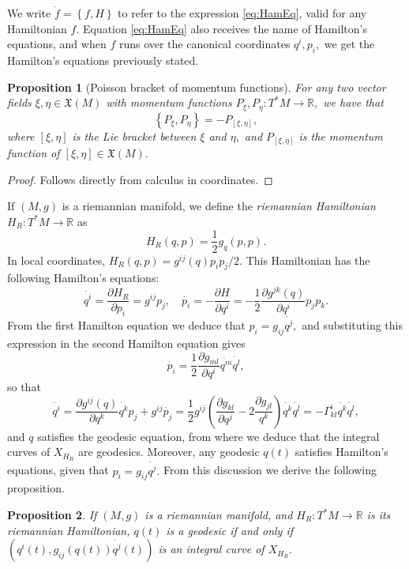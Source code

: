 \documentclass[12pt, letterpaper, reqno]{amsart}
\theoremstyle{definition}
\theoremstyle{plain}
\newtheorem{prop}{Proposition}
\theoremstyle{remark}
\begin{document}
We write $ \dot{f}= \left\{ f,H \right\} $ to refer to the expression \eqref{eq:HamEq}, valid for any Hamiltonian $ f. $ Equation \eqref{eq:HamEq} also receives the name of Hamilton's equations, and when $ f $ runs over the canonical coordinates $ q^i,p_i, $ we get the Hamilton's equations previously stated.

\begin{prop}[Poisson bracket of momentum functions]
	For any two vector fields $ \xi,\eta \in \mathfrak{X}(M) $ with momentum functions $ P_\xi, P_\eta: T^*M \rightarrow \mathbb{R}, $ we have that
	$$ \left\{ P_\xi,P_\eta \right\} = -P_{[\xi,\eta]}, $$ 
	where $ [\xi,\eta] $ is the Lie bracket between $ \xi $ and $ \eta, $ and $ P_{[\xi,\eta]} $ is the momentum function of $ [\xi,\eta]\in \mathfrak{X}(M). $  
\end{prop}
\begin{proof}
	Follows directly from calculus in coordinates.
\end{proof}
If $ (M,g) $ is a riemannian manifold, we define the \textit{riemannian Hamiltonian} $ H_R: T^*M \rightarrow \mathbb{R} $ as
$$ H_R(q,p)=\frac{1}{2} g_q(p,p).$$
In local coordinates, $  H_R(q,p)= g^{ij}(q)p_ip_j/2. $ This Hamiltonian has the following Hamilton's equations:
$$ \dot{q^i} = \frac{\partial H_R}{\partial p_i} = g^{ij}p_j, \quad \dot{p_i} = - \frac{\partial H}{\partial q^i} = - \frac{1}{2} \frac{\partial g^{jk}(q)}{\partial q^i} p_jp_k. $$ 
From the first Hamilton equation we deduce that $ p_i = g_{ij}\dot{q^j}, $ and substituting this expression in the second Hamilton equation gives $$ \dot{p_i} = \frac{1}{2} \frac{\partial g_{ml}}{\partial q^i}\dot{q^m}\dot{q^l} ,$$ so that 
$$ \ddot{q^i} = \frac{\partial g^{ij}(q)}{\partial q^k} \dot{q^k}p_j+ g^{ij}\dot{p_j}= \frac{1}{2} g^{ij} \left( \frac{\partial g_{kl}}{\partial q^j}-2 \frac{\partial g_{jl}}{q^k}   \right)\dot{q^k}\dot{q^l} = -\Gamma_{kl}^i \dot{q^k}\dot{q^l},$$ 
and $ q $ satisfies the geodesic equation, from where we deduce that the integral curves of $ X_{H_R} $ are geodesics. Moreover, any geodesic $ q(t) $ satisfies Hamilton's equations, given that $ p_i = g_{ij}\dot{q^j}. $ From this discussion we derive the following proposition.

\begin{prop}
	If $ (M,g) $ is a riemannian manifold, and $ H_R: T^*M \rightarrow \mathbb{R} $ is its riemannian Hamiltonian, $ q(t) $ is a geodesic if and only if $ (q^i(t), g_{ij}(q(t))\dot{q^j}(t)) $ is an integral curve of $ X_{H_R}. $ 
\end{prop}
\end{document}
